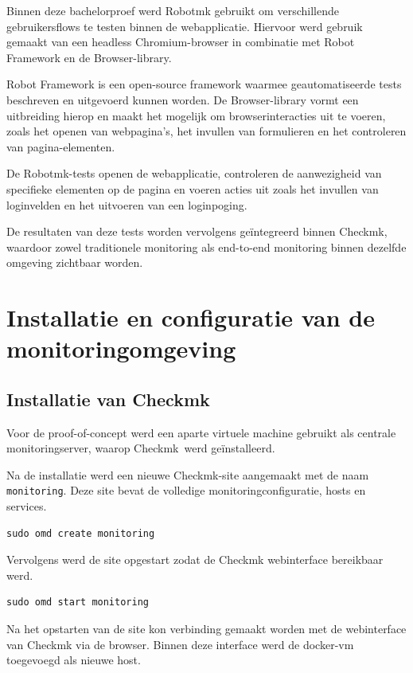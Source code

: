 Binnen deze bachelorproef werd Robotmk gebruikt om verschillende gebruikersflows te testen binnen de webapplicatie. Hiervoor werd gebruik gemaakt van een headless Chromium-browser in combinatie met Robot Framework en de Browser-library.

Robot Framework is een open-source framework waarmee geautomatiseerde tests beschreven en uitgevoerd kunnen worden. De Browser-library vormt een uitbreiding hierop en maakt het mogelijk om browserinteracties uit te voeren, zoals het openen van webpagina’s, het invullen van formulieren en het controleren van pagina-elementen.

De Robotmk-tests openen de webapplicatie, controleren de aanwezigheid van specifieke elementen op de pagina en voeren acties uit zoals het invullen van loginvelden en het uitvoeren van een loginpoging.

De resultaten van deze tests worden vervolgens geïntegreerd binnen Checkmk, waardoor zowel traditionele monitoring als end-to-end monitoring binnen dezelfde omgeving zichtbaar worden.

\section{Installatie en configuratie van de monitoringomgeving}

\subsection{Installatie van Checkmk}

Voor de proof-of-concept werd een aparte virtuele machine gebruikt als centrale monitoringserver, waarop Checkmk werd geïnstalleerd.

Na de installatie werd een nieuwe Checkmk-site aangemaakt met de naam \texttt{monitoring}. Deze site bevat de volledige monitoringconfiguratie, hosts en services.

\begin{lstlisting}[caption={Aanmaken van de Checkmk-site}]
    sudo omd create monitoring
\end{lstlisting}

Vervolgens werd de site opgestart zodat de Checkmk webinterface bereikbaar werd.

\begin{lstlisting}[caption={Opstarten van de Checkmk-site}]
    sudo omd start monitoring
\end{lstlisting}

Na het opstarten van de site kon verbinding gemaakt worden met de webinterface van Checkmk via de browser. Binnen deze interface werd de docker-vm toegevoegd als nieuwe host.

